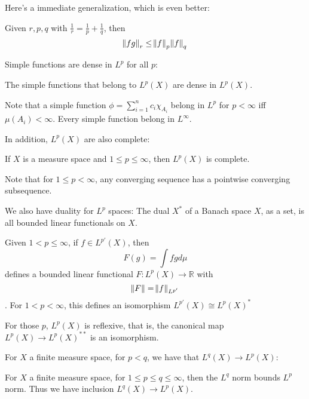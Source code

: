 \documentclass[main.tex]{subfiles}
\begin{document}
Here's a immediate generalization, which is even better:

\begin{theorem}
Given $r, p, q$ with $\frac{1}{r} = \frac{1}{p} + \frac{1}{q}$, then 
$$
\norm{fg}_r \leq \norm{f}_{p}  \norm{f}_q 
$$

\end{theorem}

Simple functions are dense in $L^p$ for all $p$:

\begin{theorem}
The simple functions that belong to $L^p(X)$ are dense in $L^p(X)$.
\end{theorem}

Note that a simple function $\phi = \sum_{i=1} ^n c_i \chi_{A_i}$ belong in $L^p$ for $p < \infty$ iff $\mu(A_i) < \infty$. Every simple function belong in $L^\infty$.

In addition, $L^p(X)$ are also complete:

\begin{theorem}
If $X$ is a measure space and $1 \leq p \leq \infty$, then $L^p(X)$ is complete.
\end{theorem}

Note that for $1 \leq p < \infty$, any converging sequence has a pointwise converging subsequence.

We also have duality for $L^p$ spaces:
The dual $X^*$ of a Banach space $X$, as a set, is all bounded linear functionals on $X$.

\begin{theorem}
Given $1 < p \leq \infty$, if $f \in L^{p'}(X)$, then 
$$
F(g) = \int fg d\mu 
$$
defines a bounded linear functional $F: L^p(X) \rightarrow \mathbb{R}$ with 
$$
\norm{F} = \norm{f}_{L^{p'}}
$$.
For $1 < p < \infty$, this defines an isomorphism $L^{p'}(X) \cong L^p(X)^*$
\end{theorem}

\begin{corollary}
For those $p$, $L^p(X)$ is reflexive, that is, the canonical map $L^p(X) \rightarrow L^p(X)^{**}$ is an isomorphism.
\end{corollary}

For $X$ a finite measure space, for $p < q$, we have that $L^q(X) \xrightarrow{} L^p(X)$:

\begin{theorem}
For $X$ a finite measure space, for $1 \leq p \leq q \leq \infty$, then the $L^q$ norm bounds $L^p$ norm. Thus we have inclusion $L^q(X) \xrightarrow{} L^p(X)$. 
\end{theorem}
\end{document}
